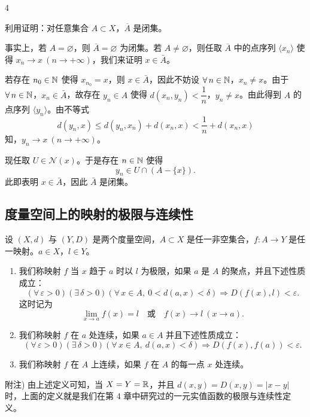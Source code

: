 \begin{sourceexample}{4}

利用证明：对任意集合 $A\subset X$，$\overline{A}$ 是闭集。

事实上，若 $A=\varnothing$，则 $\overline{A}=\varnothing$ 为闭集。若 $A\neq\varnothing$，则任取 $\overline{A}$ 中的点序列 $\langle x_n\rangle$ 使得 $x_n\to x\ (n\to+\infty)$，我们来证明 $x\in\bar A$。

若存在 $n_0\in\mathbb{N}$ 使得 $x_{n_0}=x$，则 $x\in\bar A$，因此不妨设 $\forall\,n\in\mathbb{N}$，$x_n\neq x$。由于 $\forall\,n\in\mathbb{N}$，$x_n\in\bar A$，故存在 $y_n\in A$ 使得 $d(x_n,y_n)<\dfrac1n$，$y_n\neq x$。由此得到 $A$ 的点序列 $\langle y_n\rangle$。由不等式
\[d(y_n,x)\leqslant d(y_n,x_n)+d(x_n,x)<\frac1n+d(x_n,x)\]
知，$y_n\to x\ (n\to+\infty)$。

现任取 $U\in\mathscr{N}(x)$。于是存在 $n\in\mathbb{N}$ 使得
\[y_n\in U\cap(A-\{x\}).\]
此即表明 $x\in\bar A$，因此 $\bar A$ 是闭集。

\end{sourceexample}

\subsection{度量空间上的映射的极限与连续性}
	\label{sec:10-3-2}

\begin{mydef*}{}

设 $(X,d)$ 与 $(Y,D)$ 是两个度量空间，$A\subset X$ 是任一非空集合，$f:A\to Y$ 是任一映射。$a\in X$，$l\in Y$。

\begin{enumerate}[label=\arabic{enumi})]
\item 我们称映射 $f$ 当 $x$ 趋于 $a$ 时以 $l$ 为极限，如果 $a$ 是 $A$ 的聚点，并且下述性质成立：
\[(\forall\,\varepsilon>0)(\exists\,\delta>0)(\forall\,x\in A,\ 0<d(a,x)<\delta)\Longrightarrow D(f(x),l)<\varepsilon.\]
这时记为
\[\lim_{x\to a}f(x)=l\quad\text{或}\quad f(x)\to l\ (x\to a).\]
\item 我们称映射 $f$ 在 $a$ 处连续，如果 $a\in A$ 并且下述性质成立：
\[(\forall\,\varepsilon>0)(\exists\,\delta>0)(\forall\,x\in A,\ d(a,x)<\delta)\Longrightarrow D(f(x),f(a))<\varepsilon.\]
\item 我们称映射 $f$ 在 $A$ 上连续，如果 $f$ 在 $A$ 的每一点 $x$ 处连续。
\end{enumerate}

\end{mydef*}

附注) 由上述定义可知，当 $X=Y=\mathbb{R}$，并且 $d(x,y)=D(x,y)=|x-y|$ 时，上面的定义就是我们在第 4 章中研究过的一元实值函数的极限与连续性定义。

